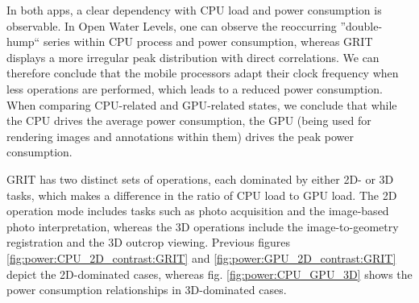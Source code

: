 \documentclass[review]{elsarticle}
\begin{document}

In both apps, a clear dependency with \gls{CPU} load and power consumption is observable. In Open Water Levels, one can observe the reoccurring ''double-hump`` series within CPU process and power consumption, whereas \gls{GRIT} displays a more irregular peak distribution with direct correlations. We can therefore conclude that the mobile processors adapt their clock frequency when less operations are performed, which leads to a reduced power consumption. When comparing \gls{CPU}-related and \gls{GPU}-related states, we conclude that while the \gls{CPU} drives the average power consumption, the GPU (being used for rendering images and annotations within them) drives the peak power consumption.

\Gls{GRIT} has two distinct sets of operations, each dominated by either 2D- or 3D tasks, which makes a difference in the ratio of \gls{CPU} load to \gls{GPU} load. The 2D operation mode includes tasks such as photo acquisition and the image-based photo interpretation, whereas the 3D operations include the image-to-geometry registration \cite{Kehl2017_VGC} and the 3D outcrop viewing. Previous figures \ref{fig:power:CPU_2D_contrast:GRIT} and \ref{fig:power:GPU_2D_contrast:GRIT} depict the 2D-dominated cases, whereas fig. \ref{fig:power:CPU_GPU_3D} shows the power consumption relationships in 3D-dominated cases.
\end{document}
